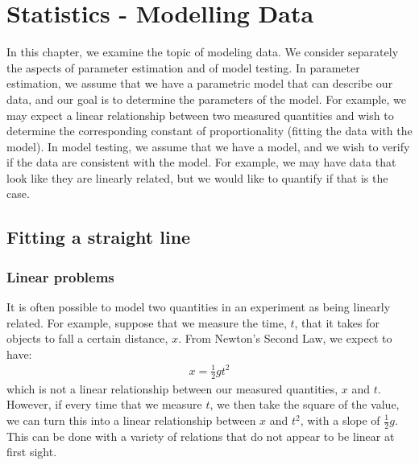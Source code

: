 %
\chapter{Statistics - Modelling Data}
\label{Chap:statModelData}
In this chapter, we examine the topic of modeling data. We consider separately the aspects of parameter estimation and of model testing. In parameter estimation, we assume that we have a parametric model that can describe our data, and our goal is to determine the parameters of the model. For example, we may expect a linear relationship between two measured quantities and wish to determine the corresponding constant of proportionality (fitting the data with the model). In model testing, we assume that we have a model, and we wish to verify if the data are consistent with the model. For example, we may have data that look like they are linearly related, but we would like to quantify if that is the case. 
 

\section{Fitting a straight line}
\subsection{Linear problems}
It is often possible to model two quantities in an experiment as being linearly related. For example, suppose that we measure the time, $t$, that it takes for objects to fall a certain distance, $x$. From Newton's Second Law, we expect to have:
\begin{align}
x = \frac{1}{2}gt^2
\end{align}
which is not a linear relationship between our measured quantities, $x$ and $t$. However, if every time that we measure $t$, we then take the square of the value, we can turn this into a linear relationship between $x$ and $t^2$, with a slope of $\frac{1}{2}g$. This can be done with a variety of relations that do not appear to be linear at first sight. 

